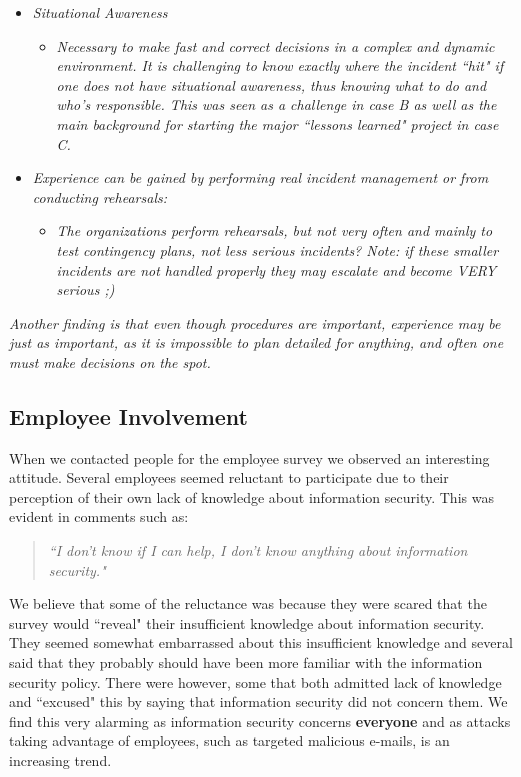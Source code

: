 \begin{itemize}
\item \textit{Situational Awareness}
\begin{itemize}
\item\textit{ Necessary to make fast and correct decisions in a complex and dynamic environment. It is challenging to know exactly where the incident ``hit" if one does not have situational awareness, thus knowing what to do and who's responsible. This was  seen as a challenge in case B as well as the main background for starting the major ``lessons learned" project in case C.}
\end{itemize}
\item \textit{Experience can be gained by performing real incident management or from conducting rehearsals:}
\begin{itemize}
\item \textit{The organizations perform rehearsals, but not very often and mainly to test contingency plans, not less serious incidents? Note: if these smaller incidents are not handled properly they may escalate and become VERY serious ;)}
\end{itemize}
\end{itemize}

\textit{Another finding is that even though procedures are important, experience may be just as important, as it is impossible to plan detailed for anything, and often one must make decisions on the spot.}

\subsection{Employee Involvement}
When we contacted people for the employee survey we observed an interesting attitude. Several employees seemed reluctant to participate due to their perception of their own lack of knowledge about information security. This was evident in comments such as:

\begin{quote}
\textit{``I don't know if I can help, I don't know anything about information security."}
\end{quote}

We believe that some of the reluctance was because they were scared that the survey would ``reveal" their insufficient knowledge about information security. They seemed somewhat embarrassed about this insufficient knowledge and several said that they probably should have been more familiar with the information security policy. There were however, some that both admitted lack of knowledge and ``excused" this by saying that information security did not concern them. We find this very alarming as information security concerns \textbf{everyone} and as attacks taking advantage of employees, such as targeted malicious e-mails, is an increasing trend. 

